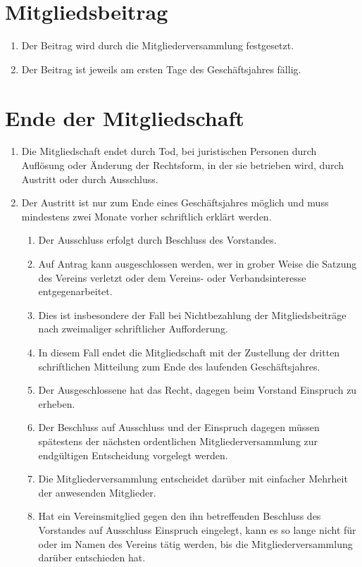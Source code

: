 \documentclass[10pt, twocolumn, parskip=half]{scrartcl}
\begin{document}
\section{Mitgliedsbeitrag}
\begin{enumerate}[noitemsep]
	\item Der Beitrag wird durch die Mitgliederversammlung festgesetzt.
	\item Der Beitrag ist jeweils am ersten Tage des Geschäftsjahres fällig.
\end{enumerate}

\section{Ende der Mitgliedschaft}
\begin{enumerate}[noitemsep]
	\item Die Mitgliedschaft endet durch Tod, bei juristischen Personen durch Auflösung oder Änderung der Rechtsform, in der sie betrieben wird, durch Austritt oder durch Ausschluss.
	\item Der Austritt ist nur zum Ende eines Geschäftsjahres möglich und muss mindestens zwei Monate vorher schriftlich erklärt werden.
	\begin{enumerate}[noitemsep]
		\item Der Ausschluss erfolgt durch Beschluss des Vorstandes.
		\item Auf Antrag kann ausgeschlossen werden, wer in grober Weise die Satzung des Vereins verletzt oder dem Vereins- oder Verbandsinteresse entgegenarbeitet.
		\item Dies ist insbesondere der Fall bei Nichtbezahlung der Mitgliedsbeiträge nach zweimaliger schriftlicher Aufforderung.
		\item In diesem Fall endet die Mitgliedschaft mit der Zustellung der dritten schriftlichen Mitteilung zum Ende des laufenden Geschäftsjahres.
		\item Der Ausgeschlossene hat das Recht, dagegen beim Vorstand Einspruch zu erheben.
		\item Der Beschluss auf Ausschluss und der Einspruch dagegen müssen spätestens der nächsten ordentlichen Mitgliederversammlung zur endgültigen Entscheidung vorgelegt werden.
		\item Die Mitgliederversammlung entscheidet darüber mit einfacher Mehrheit der anwesenden Mitglieder.
		\item Hat ein Vereinsmitglied gegen den ihn betreffenden Beschluss des Vorstandes auf Ausschluss Einspruch eingelegt, kann es so lange nicht für oder im Namen des Vereins tätig werden, bis die Mitgliederversammlung darüber entschieden hat.
	\end{enumerate}
\end{enumerate}
\end{document}
